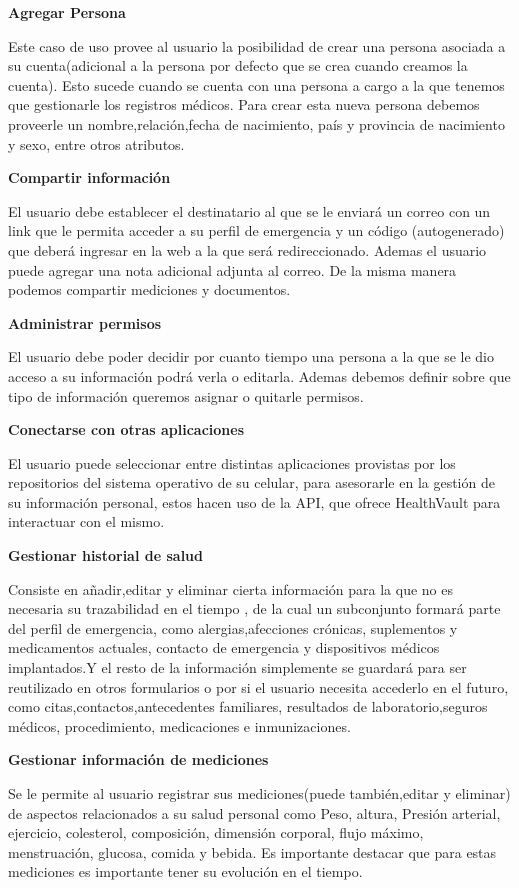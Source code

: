  {\correccionTexto
 	
\textbf{Agregar Persona}

Este caso de uso provee al usuario la posibilidad de crear una persona asociada a su cuenta(adicional a la persona por defecto que se crea cuando creamos la cuenta). Esto sucede cuando se cuenta con una persona a cargo a la que tenemos que gestionarle los registros médicos. Para crear esta nueva persona debemos proveerle un nombre,relación,fecha de nacimiento, país y provincia de nacimiento y sexo, entre otros atributos.
 
 \textbf{Compartir información}
 
El usuario debe establecer el destinatario al que se le enviará un correo con un link que le permita acceder a su perfil de emergencia y un código (autogenerado) que deberá ingresar en la web a la que será redireccionado. Ademas el usuario puede agregar una nota adicional adjunta al correo. De la misma manera podemos compartir mediciones y documentos.

\textbf{Administrar permisos}

El usuario debe poder decidir por cuanto tiempo una persona a la que se le dio acceso a su información podrá verla o editarla. Ademas debemos definir sobre que tipo de información queremos asignar o quitarle permisos.

\textbf{Conectarse con otras aplicaciones}

El usuario puede seleccionar entre distintas aplicaciones provistas por los repositorios del sistema operativo de su celular, para asesorarle en la gestión de su información personal, estos hacen uso de la API, que ofrece HealthVault para interactuar con el mismo.

\textbf{Gestionar historial de salud}

Consiste en añadir,editar y eliminar cierta información para la que no es necesaria su trazabilidad en el tiempo , de la cual un subconjunto formará parte del perfil de emergencia, como alergias,afecciones crónicas, suplementos y medicamentos actuales, contacto de emergencia y dispositivos médicos implantados.Y el resto de la información simplemente se guardará para ser reutilizado en otros formularios o por si el usuario necesita accederlo en el futuro, como citas,contactos,antecedentes familiares, resultados de laboratorio,seguros médicos, procedimiento, medicaciones e inmunizaciones.
 
\textbf{Gestionar información de mediciones}

Se le permite al usuario registrar sus mediciones(puede también,editar y eliminar) de aspectos relacionados a su salud personal como Peso, altura, Presión arterial, ejercicio, colesterol, composición, dimensión corporal, flujo máximo, menstruación, glucosa, comida y bebida. Es importante destacar que para estas mediciones es importante tener su evolución en el tiempo.

}
